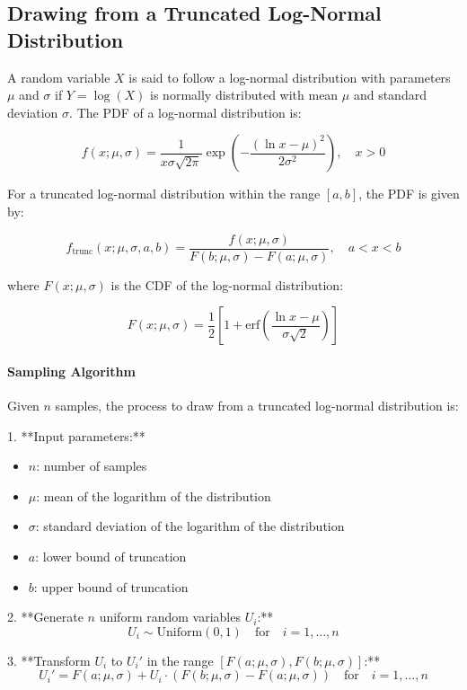 \documentclass[pdflatex,sn-mathphys-num]{sn-jnl}%
\theoremstyle{thmstyleone}%
\theoremstyle{thmstyletwo}%
\theoremstyle{thmstylethree}%
\begin{document}
\subsection{Drawing from a Truncated Log-Normal Distribution}

A random variable \( X \) is said to follow a log-normal distribution with parameters \(\mu\) and \(\sigma\) if \( Y = \log(X) \) is normally distributed with mean \(\mu\) and standard deviation \(\sigma\). The PDF of a log-normal distribution is:

\[
f(x; \mu, \sigma) = \frac{1}{x \sigma \sqrt{2 \pi}} \exp\left( -\frac{(\ln x - \mu)^2}{2\sigma^2} \right), \quad x > 0
\]

For a truncated log-normal distribution within the range \([a, b]\), the PDF is given by:

\[
f_{\text{trunc}}(x; \mu, \sigma, a, b) = \frac{f(x; \mu, \sigma)}{F(b; \mu, \sigma) - F(a; \mu, \sigma)}, \quad a < x < b
\]

where \(F(x; \mu, \sigma)\) is the CDF of the log-normal distribution:

\[
F(x; \mu, \sigma) = \frac{1}{2} \left[1 + \text{erf}\left(\frac{\ln x - \mu}{\sigma \sqrt{2}}\right)\right]
\]

\paragraph{Sampling Algorithm}

Given \( n \) samples, the process to draw from a truncated log-normal distribution is:

1. **Input parameters:**
   \begin{itemize}
       \item \( n \): number of samples
       \item \( \mu \): mean of the logarithm of the distribution
       \item \( \sigma \): standard deviation of the logarithm of the distribution
       \item \( a \): lower bound of truncation
       \item \( b \): upper bound of truncation
   \end{itemize}

2. **Generate \( n \) uniform random variables \( U_i \):**
   \[
   U_i \sim \text{Uniform}(0, 1) \quad \text{for} \quad i = 1, \ldots, n
   \]

3. **Transform \( U_i \) to \( U_i' \) in the range \([F(a; \mu, \sigma), F(b; \mu, \sigma)]\):**
   \[
   U_i' = F(a; \mu, \sigma) + U_i \cdot (F(b; \mu, \sigma) - F(a; \mu, \sigma)) \quad \text{for} \quad i = 1, \ldots, n
   \]
\end{document}
